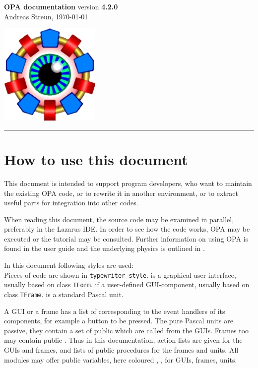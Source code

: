 \documentclass[12pt]{article}
\newcommand\code[1]{{\tt #1}}
\newcommand\guico[1]{{\color{blue}\code{#1}}}
\newcommand\guifco[1]{{\color{violet}\code{#1}}}
\newcommand{\unico}[1]{{\color{burntorange}\code{#1}}}
\newcommand{\opagui}[1]{\colorbox{blue!20}{{\color{black}\code{#1}}}}
\newcommand{\opaguif}[1]{\colorbox{violet!30}{{\color{black}\code{#1}}}}
\newcommand{\opauni}[1]{\colorbox{orange!30}{{\color{black}\code{#1}}}}
\begin{document}
\noindent
{}

\parbox[t]{0.7\hsize}{
  {\Huge\bf OPA documentation} version {\bf 4.2.0}\\
  Andreas Streun, \today
} \hfill  \includegraphics{opalogo_small.jpg}
\rule{\hsize}{1pt}

\section{How to use this document}
This document is intended to support program developers, who want to maintain the existing OPA code, or to rewrite it in another environment, or to extract useful parts for integration into other codes.

When reading this document, the source code may be examined in parallel, preferably in the Lazarus IDE. In order to see how the code works, OPA may be executed or the tutorial \cite{tutorial} may be consulted. Further information on using OPA is found in the user guide \cite{userguide} and the underlying physics is outlined in \cite{inside}.

In this document following styles are used:\\
Pieces of code are shown in \code{typewriter style}.
\opagui{GUI} is a graphical user interface, usually based on class \code{TForm}. \opaguif{Frame} if a user-defined GUI-component, usually based on class \code{TFrame}.  \opauni{Unit} is a standard Pascal unit.  

A GUI or a frame has a list of \guico{actions} corresponding to the event handlers of its components, for example a button to be pressed. The pure Pascal units are passive, they contain a set of public \unico{procedures} which are called from the GUIs. Frames too may contain public \guifco{procedures}. Thus in this documentation, action lists are given for the GUIs and frames, and lists of public procedures for the frames and units. All modules may offer public variables, here coloured \guico{x}, \guifco{y}, \unico{z} for GUIs, frames, units.
\end{document}
